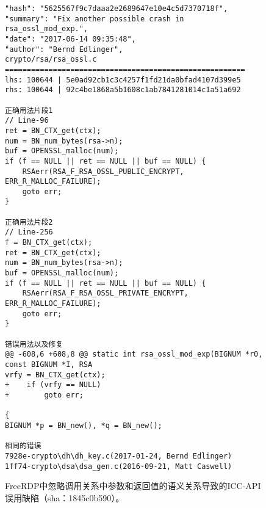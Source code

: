 \begin{figure}[t]
	\centering
\begin{lstlisting}
"hash": "5625567f9c7daaa2e2689647e10e4c5d7370718f",
"summary": "Fix another possible crash in rsa_ossl_mod_exp.",
"date": "2017-06-14 09:35:48",
"author": "Bernd Edlinger",
crypto/rsa/rsa_ossl.c
=======================================================
lhs: 100644 | 5e0ad92cb1c3c4257f1fd21da0bfad4107d399e5
rhs: 100644 | 92c4be1868a5b1608c1ab7841281014c1a51a692

正确用法片段1
// Line-96
ret = BN_CTX_get(ctx);
num = BN_num_bytes(rsa->n);
buf = OPENSSL_malloc(num);
if (f == NULL || ret == NULL || buf == NULL) {
	RSAerr(RSA_F_RSA_OSSL_PUBLIC_ENCRYPT, ERR_R_MALLOC_FAILURE);
	goto err;
}

正确用法片段2
// Line-256
f = BN_CTX_get(ctx);
ret = BN_CTX_get(ctx);
num = BN_num_bytes(rsa->n);
buf = OPENSSL_malloc(num);
if (f == NULL || ret == NULL || buf == NULL) {
	RSAerr(RSA_F_RSA_OSSL_PRIVATE_ENCRYPT, ERR_R_MALLOC_FAILURE);
	goto err;
}

错误用法以及修复
@@ -608,6 +608,8 @@ static int rsa_ossl_mod_exp(BIGNUM *r0, const BIGNUM *I, RSA 
vrfy = BN_CTX_get(ctx);
+    if (vrfy == NULL)
+        goto err;

{
BIGNUM *p = BN_new(), *q = BN_new();

相同的错误
7928e-crypto\dh\dh_key.c(2017-01-24, Bernd Edlinger)
1ff74-crypto\dsa\dsa_gen.c(2016-09-21, Matt Caswell)
\end{lstlisting}
	\caption{
	FreeRDP中忽略调用关系中参数和返回值的语义关系导致的ICC-API误用缺陷（sha：1845c0b590）。
	}
	\label{fig:2-3-dul}
\end{figure}